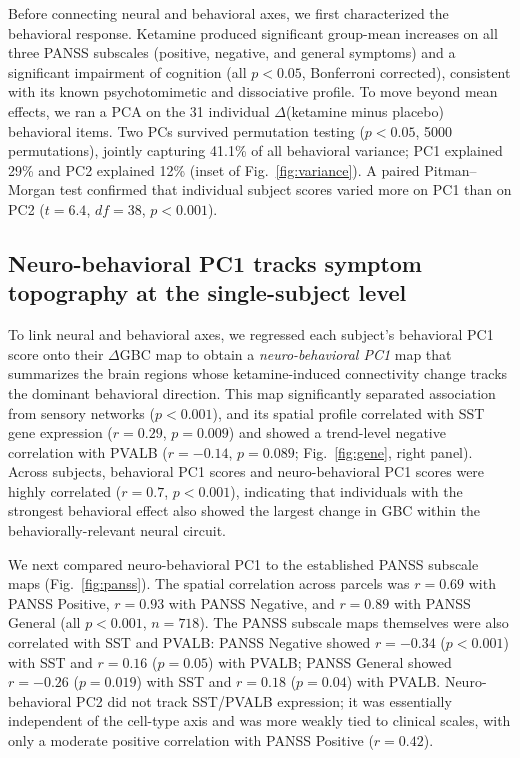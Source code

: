 \documentclass[11pt]{article}
\begin{document}
Before connecting neural and behavioral axes, we first characterized the
behavioral response. Ketamine produced significant group-mean increases on
all three PANSS subscales (positive, negative, and general symptoms) and a
significant impairment of cognition (all $p<0.05$, Bonferroni corrected),
consistent with its known psychotomimetic and dissociative profile. To move
beyond mean effects, we ran a PCA on the 31 individual $\Delta$(ketamine
minus placebo) behavioral items. Two PCs survived permutation testing
($p<0.05$, 5000 permutations), jointly capturing 41.1\% of all behavioral
variance; PC1 explained 29\% and PC2 explained 12\% (inset of
Fig.~\ref{fig:variance}). A paired Pitman--Morgan test confirmed that
individual subject scores varied more on PC1 than on PC2 ($t=6.4$, $df=38$,
$p<0.001$).

\subsection{Neuro-behavioral PC1 tracks symptom topography at the
single-subject level}

To link neural and behavioral axes, we regressed each subject's behavioral
PC1 score onto their $\Delta$GBC map to obtain a \emph{neuro-behavioral PC1}
map that summarizes the brain regions whose ketamine-induced connectivity
change tracks the dominant behavioral direction. This map significantly
separated association from sensory networks ($p<0.001$), and its spatial
profile correlated with SST gene expression ($r=0.29$, $p=0.009$) and
showed a trend-level negative correlation with PVALB ($r=-0.14$, $p=0.089$;
Fig.~\ref{fig:gene}, right panel). Across subjects, behavioral PC1 scores
and neuro-behavioral PC1 scores were highly correlated ($r=0.7$, $p<0.001$),
indicating that individuals with the strongest behavioral effect also showed
the largest change in GBC within the behaviorally-relevant neural circuit.

We next compared neuro-behavioral PC1 to the established PANSS subscale maps
(Fig.~\ref{fig:panss}). The spatial correlation across parcels was $r=0.69$
with PANSS Positive, $r=0.93$ with PANSS Negative, and $r=0.89$ with PANSS
General (all $p<0.001$, $n=718$). The PANSS subscale maps themselves were
also correlated with SST and PVALB: PANSS Negative showed $r=-0.34$
($p<0.001$) with SST and $r=0.16$ ($p=0.05$) with PVALB; PANSS General
showed $r=-0.26$ ($p=0.019$) with SST and $r=0.18$ ($p=0.04$) with PVALB.
Neuro-behavioral PC2 did not track SST/PVALB expression; it was essentially
independent of the cell-type axis and was more weakly tied to clinical
scales, with only a moderate positive correlation with PANSS Positive
($r=0.42$).
\end{document}
